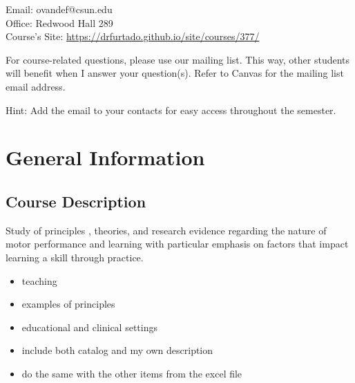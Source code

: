 \documentclass[
  letterpaper,
  DIV=11,
  numbers=noendperiod]{scrartcl}
\providecommand{\tightlist}{%
  \setlength{\itemsep}{0pt}\setlength{\parskip}{0pt}}\usepackage{longtable,booktabs,array}
\begin{document}
Email: ovandef@csun.edu\\
Office: Redwood Hall 289\\
Course's Site: \url{https://drfurtado.github.io/site/courses/377/}

\begin{tcolorbox}[enhanced jigsaw, leftrule=.75mm, breakable, opacityback=0, bottomrule=.15mm, rightrule=.15mm, colbacktitle=quarto-callout-note-color!10!white, colframe=quarto-callout-note-color-frame, arc=.35mm, bottomtitle=1mm, left=2mm, title=\textcolor{quarto-callout-note-color}{\faInfo}\hspace{0.5em}{Note}, titlerule=0mm, toptitle=1mm, toprule=.15mm, opacitybacktitle=0.6, colback=white, coltitle=black]

For course-related questions, please use our mailing list. This way,
other students will benefit when I answer your question(s). Refer to
Canvas for the mailing list email address.

Hint: Add the email to your contacts for easy access throughout the
semester.

\end{tcolorbox}

\hypertarget{general-information}{%
\section{General Information}\label{general-information}}

\hypertarget{course-description}{%
\subsection{Course Description}\label{course-description}}

Study of principles , theories, and research evidence regarding the
nature of motor performance and learning with particular emphasis on
factors that impact learning a skill through practice.

\begin{itemize}
\tightlist
\item
  teaching
\item
  examples of principles
\item
  educational and clinical settings
\item
  include both catalog and my own description
\item
  do the same with the other items from the excel file
\end{itemize}
\end{document}
